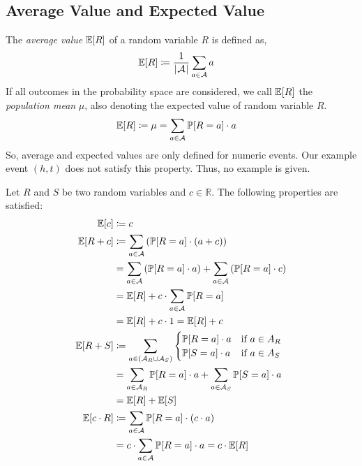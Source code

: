 \subsection{Average Value and Expected Value}
\label{sec:bp-ae}
%
The \emph{average value} $\mathbb E[R]$ of a random variable $R$ is defined as,
\begin{align}
  \mathbb E[R] &\coloneqq \frac{1}{\left|\hskip .06667em \mathcal A\hskip .06667em \right|} \sum_{a \in \mathcal A} a
\end{align}
If all outcomes in the probability space are considered, we call $\mathbb E[R]$ the \emph{population mean} $\mu$,
also denoting the expected value of random variable $R$.
\begin{align}
  \mathbb E[R] &\coloneqq \mu = \sum_{a \in \mathcal A} \mathbb P[R=a] \cdot a
\end{align}
So, average and expected values are only defined for numeric events.
Our example event $(h,t)$ does not satisfy this property.
Thus, no example is given.

Let $R$ and $S$ be two random variables and $c \in \mathbb R$.
The following properties are satisfied:
\begin{align}
  \mathbb E[c]     &\coloneqq c \\
  \mathbb E[R + c] &\coloneqq \sum_{a \in \mathcal A} \left(\mathbb P[R=a] \cdot (a + c)\right) \nonumber\\
            &= \sum_{a \in \mathcal A} \left(\mathbb P[R=a] \cdot a\right) + \sum_{a \in \mathcal A} \left(\mathbb P[R=a] \cdot c\right) \nonumber\\
            &= \mathbb E[R] + c \cdot \sum_{a \in \mathcal A} \mathbb P[R=a] \nonumber\\
            &= \mathbb E[R] + c \cdot 1 = \mathbb E[R] + c \\
  \mathbb E[R + S] &\coloneqq \sum_{a \in (\mathcal A_R \cup \mathcal A_S)}
              \begin{cases}
                \mathbb P[R=a] \cdot a & \text{if } a \in A_R \\
                \mathbb P[S=a] \cdot a & \text{if } a \in A_S
              \end{cases}\nonumber\\
            &= \sum_{a \in \mathcal A_R} \mathbb P[R=a] \cdot a + \sum_{a \in \mathcal A_S} \mathbb P[S=a] \cdot a \nonumber\\
            &= \mathbb E[R] + \mathbb E[S] \\
  \mathbb E[c \cdot R] &\coloneqq \sum_{a \in \mathcal A} \mathbb P[R=a] \cdot (c \cdot a) \nonumber\\
            &= c \cdot \sum_{a \in \mathcal A} \mathbb P[R=a] \cdot a = c \cdot \mathbb E[R]
\end{align}

